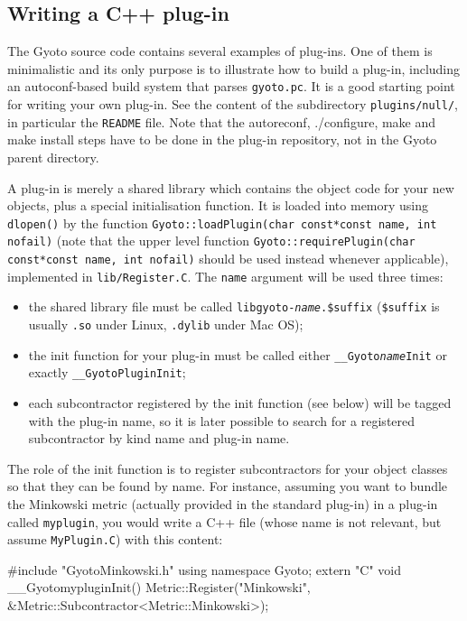 \documentclass[a4paper,12pt]{article}
\begin{document}
\subsection{Writing a C++ plug-in}
\label{sect:plug-in}

The Gyoto source code contains several examples of plug-ins. One of
them is minimalistic and its only purpose is to illustrate how to
build a plug-in, including an autoconf-based build system that parses
\texttt{gyoto.pc}. It is a good starting point for writing your own
plug-in. See the content of the subdirectory \texttt{plugins/null/},
in particular the \texttt{README} file. Note that the autoreconf, 
./configure, make and make install steps have to be done in the plug-in 
repository, not in the Gyoto parent directory.

A plug-in is merely a shared library which contains the object code
for your new objects, plus a special initialisation function. It is
loaded into memory using \texttt{dlopen()} by the function
\texttt{Gyoto::loadPlugin(char const*const name, int nofail)} (note
that the upper level function \texttt{Gyoto::requirePlugin(char
  const*const name, int nofail)} should be used instead whenever
applicable), implemented in \texttt{lib/Register.C}. The \texttt{name}
argument will be used three times:
\begin{itemize}
\item the shared library file must be called
  \texttt{libgyoto-\emph{name}.\$suffix} (\texttt{\$suffix} is usually
  \texttt{.so} under Linux, \texttt{.dylib} under Mac OS);
\item the init function for your plug-in must be called either
  \texttt{\_\_Gyoto\emph{name}Init} or exactly
  \texttt{\_\_GyotoPluginInit};
\item each subcontractor registered by the init function (see below)
  will be tagged with the plug-in name, so it is later possible to
  search for a registered subcontractor by kind name and plug-in name.
\end{itemize}

The role of the init function is to register subcontractors for your
object classes so that they can be found by name. For instance,
assuming you want to bundle the Minkowski metric (actually provided in
the standard plug-in) in a plug-in called \texttt{myplugin}, you would
write a C++ file (whose name is not relevant, but assume
\texttt{MyPlugin.C}) with this content:

\begin{code}
#include "GyotoMinkowski.h"
using namespace Gyoto;
extern "C" void __GyotomypluginInit() {
  Metric::Register("Minkowski", \&Metric::Subcontractor<Metric::Minkowski>);
}
\end{code}
\end{document}

